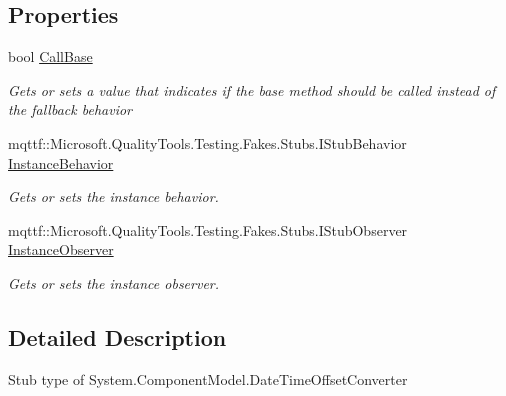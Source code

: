 \subsection*{Properties}
\begin{DoxyCompactItemize}
\item 
bool \hyperlink{class_system_1_1_component_model_1_1_fakes_1_1_stub_date_time_offset_converter_a274bfe86e647f89a1c5f72efcd0aced6}{Call\-Base}
\begin{DoxyCompactList}\small\item\em Gets or sets a value that indicates if the base method should be called instead of the fallback behavior\end{DoxyCompactList}\item 
mqttf\-::\-Microsoft.\-Quality\-Tools.\-Testing.\-Fakes.\-Stubs.\-I\-Stub\-Behavior \hyperlink{class_system_1_1_component_model_1_1_fakes_1_1_stub_date_time_offset_converter_a437e07f390af061b9754a11b8db950a3}{Instance\-Behavior}
\begin{DoxyCompactList}\small\item\em Gets or sets the instance behavior.\end{DoxyCompactList}\item 
mqttf\-::\-Microsoft.\-Quality\-Tools.\-Testing.\-Fakes.\-Stubs.\-I\-Stub\-Observer \hyperlink{class_system_1_1_component_model_1_1_fakes_1_1_stub_date_time_offset_converter_a9f0b7e676014a0ecf102361358508bf5}{Instance\-Observer}
\begin{DoxyCompactList}\small\item\em Gets or sets the instance observer.\end{DoxyCompactList}\end{DoxyCompactItemize}


\subsection{Detailed Description}
Stub type of System.\-Component\-Model.\-Date\-Time\-Offset\-Converter



